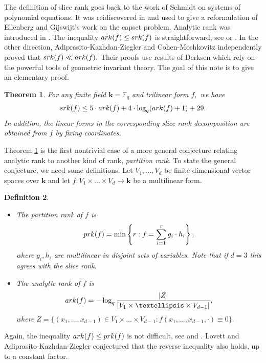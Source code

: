 \documentclass{daj}
\newtheorem{theorem}{Theorem}[section]
\newtheorem{definition}[theorem]{Definition}
\renewcommand{\k}{{\mathbf{k}}}
\newcommand{\F}{\mathbb{F}}
\newcommand{\ark}{\textnormal{ark}}
\newcommand{\prk}{\textnormal{prk}}
\newcommand{\srk}{\textnormal{srk}}
\begin{document}
The definition of slice rank goes back to the work of Schmidt \cite{S} on systems of polynomial equations. It was reidiscovered in \cite{T} and used to give a reformulation of Ellenberg and Gijswijt's work on the capset problem. Analytic rank was introduced in \cite{GW}. The inequality $\ark(f)\le \srk(f)$ is straightforward, see \cite{KZ} or \cite{L}. In the other direction, Adiprasito-Kazhdan-Ziegler \cite{AKZ} and Cohen-Moshkovitz \cite{CM-cubics} independently proved that $\srk(f) \ll \ark(f).$ Their proofs use results of Derksen \cite{D} which rely on the powerful tools of geometric invariant theory. The goal of this note is to give an elementary proof.

\begin{theorem}\label{main} For any finite field $\k =\F_q$ and trilinear form $f,$ we have
$$\srk(f) \le 5\cdot \ark(f)+4\cdot \log_q(\ark(f)+1)+29.$$
In addition, the linear forms in the corresponding slice rank decomposition are obtained from $f$ by fixing coordinates.
\end{theorem}

Theorem \ref{main} is the first nontrivial case of a more general conjecture relating analytic rank to another kind of rank, \emph{partition rank}. To state the general conjecture, we need some definitions. Let $V_1,\ldots,V_d$ be finite-dimensional vector spaces over $\k$ and let $f:V_1\times\ldots\times V_d\to \k$ be a multilinear form.

\begin{definition}
    \begin{itemize}
    \item The \emph{partition rank} of $f$ is 
    \[
    \prk(f) = \min\left\{r: f = \sum_{i=1}^r g_i\cdot h_i\right\},
    \]
    where $g_i,h_i$ are multilinear in disjoint sets of variables. Note that if $d=3$ this agrees with the slice rank.
    \item The \emph{analytic rank} of $f$ is 
    \[
    \ark(f) = -\log_q \frac{|Z|}{|V_1\times\ldots\times V_{d-1}|},
    \]
    where $Z = \{(x_1,\ldots,x_{d-1})\in V_1\times\ldots\times V_{d-1}: f(x_1,\ldots,x_{d-1},\cdot) \equiv 0\}.$
\end{itemize}
    
\end{definition}

Again, the inequality $\ark(f)\le \prk(f)$ is not difficult, see \cite{KZ} and \cite{L}.  Lovett \cite{L} and Adiprasito-Kazhdan-Ziegler \cite{AKZ} conjectured that the reverse inequality also holds, up to a constant factor.
\end{document}
